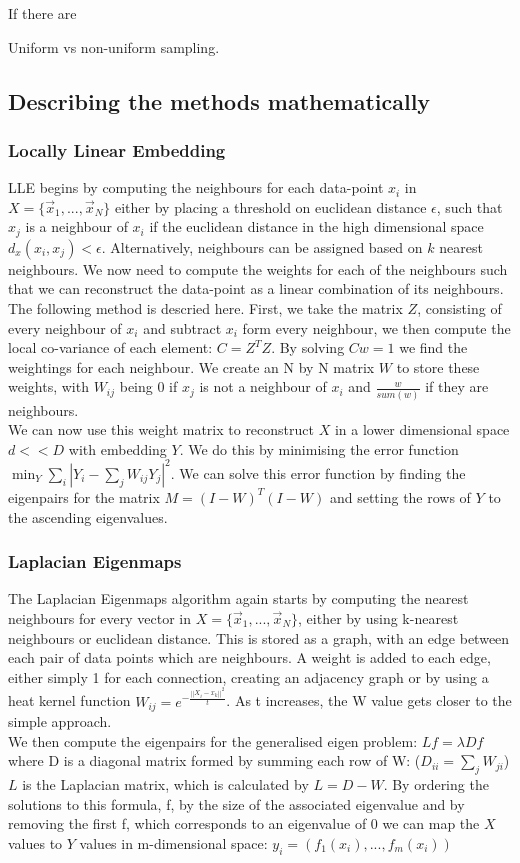 \documentclass{article}
\begin{document}
If there are 

Uniform vs non-uniform sampling.
\subsection{Describing the methods mathematically}
\subsubsection{Locally Linear Embedding}
LLE begins by computing the neighbours for each data-point $x_i$ in $X = \{\vec{x}_1,...,\vec{x}_N\}$ either by placing a threshold on euclidean distance $\epsilon$, such that $x_j$ is a neighbour of $x_i$ if the euclidean distance in the high dimensional space $d_x(x_i,x_j) < \epsilon$. Alternatively, neighbours can be assigned based on $k$ nearest neighbours. We now need to compute the weights for each of the neighbours such that we can reconstruct the data-point as a linear combination of its neighbours. The following method is descried here.\cite{LLERoweis} First, we take the matrix $Z$, consisting of every neighbour of $x_i$ and subtract $x_i$ form every neighbour, we then compute the local co-variance of each element: $C = Z^TZ$. By solving $Cw = 1$ we find the weightings for each neighbour. We create an N by N matrix $W$ to store these weights, with $W_{ij}$ being 0 if $x_j$ is not a neighbour of $x_i$ and $\frac{w}{sum(w)}$ if they are neighbours.\\
We can now use this weight matrix to reconstruct $X$ in a lower dimensional space $d<<D$ with embedding $Y$. We do this by minimising the error function $\min_Y\sum\limits_{i}|Y_i-\sum\limits_{j}W_{ij}Y_j|^2$.\cite{ghodsi2006dimensionality} We can solve this error function by finding the eigenpairs for the matrix $M = (I-W)^T(I-W)$ and setting the rows of $Y$ to the ascending eigenvalues.
\subsubsection{Laplacian Eigenmaps}
The Laplacian Eigenmaps algorithm again starts by computing the nearest neighbours for every vector in $X = \{\vec{x}_1,...,\vec{x}_N\}$, either by using k-nearest neighbours or euclidean distance. This is stored as a graph, with an edge between each pair of data points which are neighbours. A weight is added to each edge, either simply 1 for each connection, creating an adjacency graph or by using a heat kernel function $W_{ij}=e^{-\frac{||X_i-x_k||^2}{t}}$. As t increases, the W value gets closer to the simple approach.\cite{hagueeigen} \\
We then compute the eigenpairs for the generalised eigen problem: $Lf = \lambda Df$ where D is a diagonal matrix formed by summing each row of W: ($D_{ii} = \sum\limits_jW_{ji}$) $L$ is the Laplacian matrix, which is calculated by $L = D-W$. By ordering the solutions to this formula, f, by the size of the associated eigenvalue and by removing the first f, which corresponds to an eigenvalue of 0 we can map the $X$ values to $Y$ values in m-dimensional space: $y_i = (f_1(x_i),...,f_m(x_i))$
\end{document}
